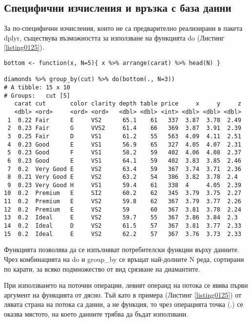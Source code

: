 \subsection{Специфични изчисления и връзка с база данни}

За по-специфични изчисления, които не са предварително реализирани в пакета dplyr, съществува възможността за използване на функцията do (Листинг \ref{listing0125}).

\begin{lstlisting}[caption=Специфични изчисления, label=listing0125]
bottom <- function(x, N=5){ x %>% arrange(carat) %>% head(N) }
 
diamonds %>% group_by(cut) %>% do(bottom(., N=3))
# A tibble: 15 x 10
# Groups:   cut [5]
   carat cut       color clarity depth table price     x     y     z
   <dbl> <ord>     <ord> <ord>   <dbl> <dbl> <int> <dbl> <dbl> <dbl>
 1  0.22 Fair      E     VS2      65.1    61   337  3.87  3.78  2.49
 2  0.23 Fair      G     VVS2     61.4    66   369  3.87  3.91  2.39
 3  0.25 Fair      D     VS1      61.2    55   563  4.09  4.11  2.51
 4  0.23 Good      E     VS1      56.9    65   327  4.05  4.07  2.31
 5  0.23 Good      F     VS1      58.2    59   402  4.06  4.08  2.37
 6  0.23 Good      E     VS1      64.1    59   402  3.83  3.85  2.46
 7  0.2  Very Good E     VS2      63.4    59   367  3.74  3.71  2.36
 8  0.21 Very Good E     VS2      63.2    54   386  3.82  3.78  2.4 
 9  0.23 Very Good H     VS1      59.4    61   338  4     4.05  2.39
10  0.2  Premium   E     SI2      60.2    62   345  3.79  3.75  2.27
11  0.2  Premium   E     VS2      59.8    62   367  3.79  3.77  2.26
12  0.2  Premium   E     VS2      59      60   367  3.81  3.78  2.24
13  0.2  Ideal     E     VS2      59.7    55   367  3.86  3.84  2.3 
14  0.2  Ideal     D     VS2      61.5    57   367  3.81  3.77  2.33
15  0.2  Ideal     E     VS2      62.2    57   367  3.76  3.73  2.33
\end{lstlisting}

Функцията позволява да се изпълняват потребителски функции върху данните. Чрез комбинацията на do и group\_by се връщат най-долните N реда, сортирани по карати, за всяко подмножество от вид срязване на диамантите.

При използването на поточни операции, левият операнд на потока се явява първи аргумент на функцията от дясно. Тъй като в примера (Листинг \ref{listing0125}) от лявата страна на потока са данни, а не функция, то чрез операцията точка (.) се оказва мястото, на което данните трябва да бъдат използвани.

